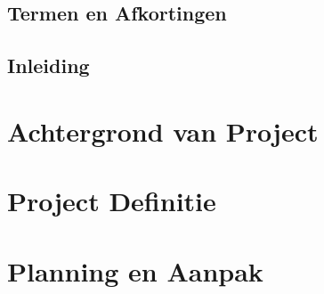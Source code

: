 \documentclass{../local}
\begin{document}
\newpage{}

\section{Termen en Afkortingen}


\section{Inleiding}


\newpage{}
\renewcommand{\thesection}{\arabic{section}}
\setlength{\cftbeforetoctitleskip}{-3em}
\tableofcontents

\clearpage

\chapter{Achtergrond van Project} 


\chapter{Project Definitie}


\chapter{Planning en Aanpak}






\end{document}
